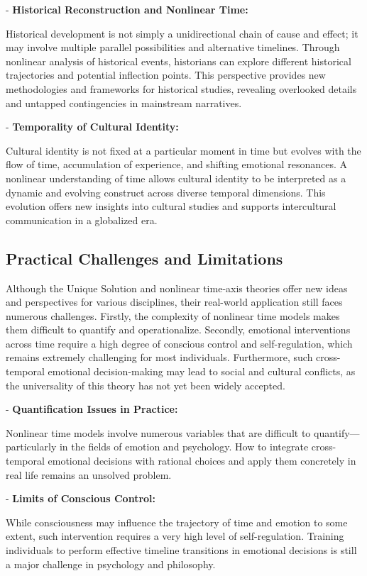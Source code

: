 \documentclass{article}
\begin{document}
- \textbf{Historical Reconstruction and Nonlinear Time:}

Historical development is not simply a unidirectional chain of cause and effect; it may involve multiple parallel possibilities and alternative timelines. Through nonlinear analysis of historical events, historians can explore different historical trajectories and potential inflection points. This perspective provides new methodologies and frameworks for historical studies, revealing overlooked details and untapped contingencies in mainstream narratives.

- \textbf{Temporality of Cultural Identity:}

Cultural identity is not fixed at a particular moment in time but evolves with the flow of time, accumulation of experience, and shifting emotional resonances. A nonlinear understanding of time allows cultural identity to be interpreted as a dynamic and evolving construct across diverse temporal dimensions. This evolution offers new insights into cultural studies and supports intercultural communication in a globalized era.

\subsection{Practical Challenges and Limitations}

Although the Unique Solution and nonlinear time-axis theories offer new ideas and perspectives for various disciplines, their real-world application still faces numerous challenges. Firstly, the complexity of nonlinear time models makes them difficult to quantify and operationalize. Secondly, emotional interventions across time require a high degree of conscious control and self-regulation, which remains extremely challenging for most individuals. Furthermore, such cross-temporal emotional decision-making may lead to social and cultural conflicts, as the universality of this theory has not yet been widely accepted.

- \textbf{Quantification Issues in Practice:}

Nonlinear time models involve numerous variables that are difficult to quantify—particularly in the fields of emotion and psychology. How to integrate cross-temporal emotional decisions with rational choices and apply them concretely in real life remains an unsolved problem.

- \textbf{Limits of Conscious Control:}

While consciousness may influence the trajectory of time and emotion to some extent, such intervention requires a very high level of self-regulation. Training individuals to perform effective timeline transitions in emotional decisions is still a major challenge in psychology and philosophy.
\end{document}
